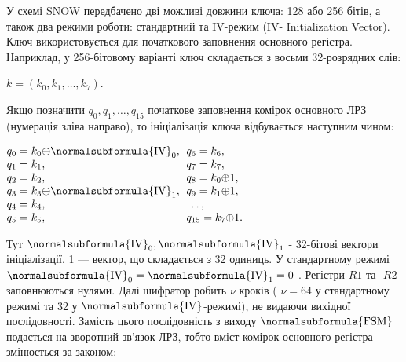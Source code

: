 \bigskip

У схемі SNOW передбачено дві можливі довжини ключа: 128 або 256 бітів, а також
два режими роботи: стандартний та IV{}-режим (IV{}- Initialization Vector).
Ключ використовується для початкового заповнення основного регістра. Наприклад,
у 256-бітовому варіанті ключ складається з восьми 32-розрядних слів: 

{\centering
 ${k=(k_{{0}},k_{{1}},\dots,k_{{7}})}$.
\par}

Якщо позначити   ${q_{{0}},q_{{1}},\dots,q_{{\text{15}}}}$
початкове заповнення комірок основного ЛРЗ (нумерація зліва направо), то
ініціалізація ключа відбувається наступним чином:


\bigskip

{\centering

$\begin{matrix}{q_{{0}}=k_{{0}}{\oplus}\normalsubformula{\text{IV}}_{{0}},}\hfill\null
\\q_{{1}}=k_{{1}},\hfill\null \\q_{{2}}=k_{{2}},\hfill\null
\\q_{{3}}=k_{{3}}{\oplus}\normalsubformula{\text{IV}}_{{1}},\hfill\null
\\q_{{4}}=k_{{4}},\hfill\null \\q_{{5}}=k_{{5}},\hfill\null \end{matrix}\hfill
$   $\begin{matrix}{q_{{6}}=k_{{6}},}\hfill\null \\q_{{7}}=k_{{7}},\hfill\null
\\q_{{8}}=k_{{0}}{\oplus}1,\hfill\null \\q_{{9}}=k_{{1}}{\oplus}1,\hfill\null
\\\dots,\hfill\null
\\q_{{\text{15}}}=k_{{7}}{\oplus}1\text{.}\hfill\null \end{matrix}\hfill $
\par}

Тут  ${\normalsubformula{\text{IV}}_{{0}},\normalsubformula{\text{IV}}_{{1}}}$ 
{}- 32-бітові вектори ініціалізації, 1 --- вектор, що складається з 32 одиниць. У
стандартному режимі 
${\normalsubformula{\text{IV}}_{{0}}=\normalsubformula{\text{IV}}_{{1}}=0}$ .
Регістри   ${\mathit{R1}}$ та $ $ ${\mathit{R2}}$ заповнюються нулями. Далі
шифратор робить   ${\nu }$ кроків ( ${\nu =\text{64}}$ у стандартному режимі та
32 у  ${\normalsubformula{\text{IV}}}${}-режимі), не видаючи вихідної
послідовності. Замість цього послідовність з виходу 
${\normalsubformula{\text{FSM}}}$ подається на зворотний зв’язок ЛРЗ, тобто
вміст комірок основного регістра змінюється за законом:

